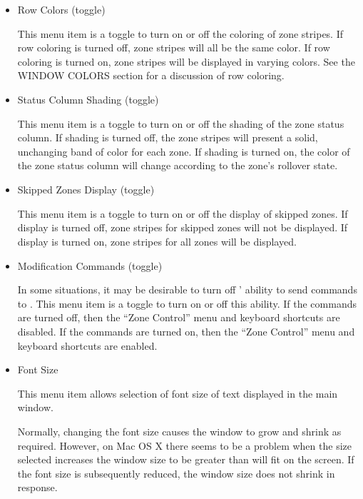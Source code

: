 \begin{itemize}

\item Row Colors (toggle)\verb" "

This menu item is a toggle to turn on or off the coloring of zone stripes.
If row coloring is turned off, zone stripes will all be the same color.
If row coloring is turned on, zone stripes will be displayed in varying
colors.  See the WINDOW COLORS section for a discussion of row coloring.

\item Status Column Shading (toggle)\verb" "

This menu item is a toggle to turn on or off the shading of the zone status
column.  If shading is turned off, the zone stripes will present a solid,
unchanging band of color for each zone.  If shading is turned on, the color
of the zone status column will change according to the zone's rollover state.

\item Skipped Zones Display (toggle)\verb" "

This menu item is a toggle to turn on or off the display of skipped zones.  If
display is turned off, zone stripes for skipped zones will not be displayed.
If display is turned on, zone stripes for all zones will be displayed.

\item Modification Commands (toggle)\verb" "

In some situations, it may be desirable to turn off '
ability to send commands to .  This menu item is a toggle to turn
on or off this ability.  If the commands are turned off, then the ``Zone
Control'' menu and keyboard shortcuts are disabled.  If the commands are
turned on, then the ``Zone Control'' menu and keyboard shortcuts are enabled.

\item Font Size\verb" "

This menu item allows selection of font size of text displayed in the main
window.

Normally, changing the font size causes the window to grow and shrink as
required.  However, on Mac OS X there seems to be a problem when the size
selected increases the window size to be greater than will fit on the screen.
If the font size is subsequently reduced, the window size does not shrink in
response.

\end{itemize}

